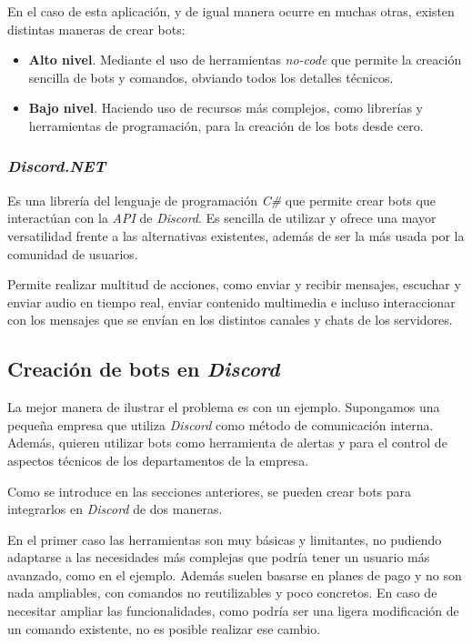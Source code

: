 En el caso de esta aplicación, y de igual manera ocurre en muchas otras, existen distintas maneras de crear bots:

\begin{itemize}
	\item \textbf{Alto nivel}. Mediante el uso de herramientas \textit{no-code} que permite la creación sencilla de bots y comandos, obviando todos los detalles técnicos.
	\item \textbf{Bajo nivel}. Haciendo uso de recursos más complejos, como librerías y herramientas de programación, para la creación de los bots desde cero.
\end{itemize}

\subsubsection{\textit{Discord.NET}}

Es una librería del lenguaje de programación \textit{C\#} que permite crear bots que interactúan con la \textit{API} de \textit{Discord}. Es sencilla de utilizar y ofrece una mayor versatilidad frente a las alternativas existentes, además de ser la más usada por la comunidad de usuarios.

Permite realizar multitud de acciones, como enviar y recibir mensajes, escuchar y enviar audio en tiempo real, enviar contenido multimedia e incluso interaccionar con los mensajes que se envían en los distintos canales y chats de los servidores.


\subsection{Creación de bots en \textit{Discord}}

La mejor manera de ilustrar el problema es con un ejemplo. Supongamos una pequeña empresa que utiliza \textit{Discord} como método de comunicación interna. Además, quieren utilizar bots como herramienta de alertas y para el control de aspectos técnicos de los departamentos de la empresa.

Como se introduce en las secciones anteriores, se pueden crear bots para integrarlos en \textit{Discord} de dos maneras.

En el primer caso las herramientas son muy básicas y limitantes, no pudiendo adaptarse a las necesidades más complejas que podría tener un usuario más avanzado, como en el ejemplo. Además suelen basarse en planes de pago y no son nada ampliables, con comandos no reutilizables y poco concretos. En caso de necesitar ampliar las funcionalidades, como podría ser una ligera modificación de un comando existente, no es posible realizar ese cambio.

